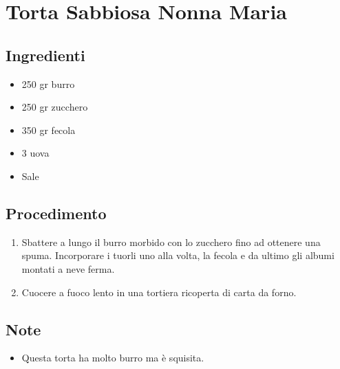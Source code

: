 \section{Torta Sabbiosa Nonna Maria}
\subsection{Ingredienti}
\begin{itemize}
\item 250 gr burro  
\item 250 gr zucchero  
\item 350 gr fecola  
\item 3 uova  
\item Sale
\end{itemize}
\subsection{Procedimento}
\begin{enumerate}
\item  Sbattere a lungo il burro morbido con lo zucchero fino ad ottenere una spuma. Incorporare i tuorli uno alla volta, la fecola e da ultimo gli albumi montati a neve ferma.  
\item  Cuocere a fuoco lento in una tortiera ricoperta di carta da forno.
\end{enumerate}
\subsection{Note}
\begin{itemize}
\item Questa torta ha molto burro ma è squisita.
\end{itemize}
